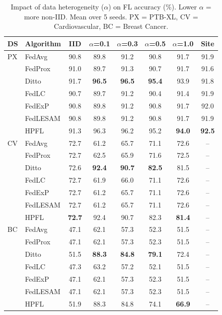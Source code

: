 \documentclass[conference,a4paper]{IEEEtran}
\begin{document}
\begin{table}[t]
\centering
\caption{Impact of data heterogeneity ($\alpha$) on FL accuracy (\%). Lower $\alpha$ = more non-IID. Mean over 5 seeds. PX = PTB-XL, CV = Cardiovascular, BC = Breast Cancer.}
\label{tab:heterogeneity}
\small
\begin{tabular}{llcccccc}
\toprule
\textbf{DS} & \textbf{Algorithm} & \textbf{IID} & \textbf{$\alpha$=0.1} & \textbf{$\alpha$=0.3} & \textbf{$\alpha$=0.5} & \textbf{$\alpha$=1.0} & \textbf{Site} \\
\midrule
PX & FedAvg & 90.8 & 89.8 & 91.2 & 90.8 & 91.7 & 91.9 \\
 & FedProx & 91.0 & 89.7 & 91.3 & 90.7 & 91.7 & 91.6 \\
 & Ditto & 91.7 & \textbf{96.5} & \textbf{96.5} & \textbf{95.4} & 93.9 & 91.8 \\
 & FedLC & 90.7 & 89.7 & 91.2 & 90.4 & 91.4 & 91.9 \\
 & FedExP & 90.8 & 89.8 & 91.2 & 90.8 & 91.7 & 92.0 \\
 & FedLESAM & 90.8 & 89.8 & 91.2 & 90.8 & 91.7 & 91.9 \\
 & HPFL & 91.3 & 96.3 & 96.2 & 95.2 & \textbf{94.0} & \textbf{92.5} \\
\midrule
CV & FedAvg & 72.7 & 61.2 & 65.7 & 71.1 & 72.6 & -- \\
 & FedProx & 72.7 & 62.5 & 65.9 & 71.6 & 72.5 & -- \\
 & Ditto & 72.6 & \textbf{92.4} & \textbf{90.7} & \textbf{82.5} & 81.5 & -- \\
 & FedLC & 72.7 & 61.9 & 66.0 & 71.1 & 72.6 & -- \\
 & FedExP & 72.7 & 61.2 & 65.7 & 71.1 & 72.6 & -- \\
 & FedLESAM & 72.7 & 61.2 & 65.7 & 71.1 & 72.6 & -- \\
 & HPFL & \textbf{72.7} & 92.4 & 90.7 & 82.3 & \textbf{81.4} & -- \\
\midrule
BC & FedAvg & 47.1 & 62.1 & 57.3 & 52.3 & 51.5 & -- \\
 & FedProx & 47.1 & 62.1 & 57.3 & 52.3 & 51.5 & -- \\
 & Ditto & 51.5 & \textbf{88.3} & \textbf{84.8} & \textbf{79.1} & 72.4 & -- \\
 & FedLC & 47.3 & 63.2 & 57.2 & 52.1 & 51.5 & -- \\
 & FedExP & 47.1 & 62.1 & 57.3 & 52.3 & 51.5 & -- \\
 & FedLESAM & 47.1 & 62.1 & 57.3 & 52.3 & 51.5 & -- \\
 & HPFL & 51.9 & 88.3 & 84.8 & 74.1 & \textbf{66.9} & -- \\
\bottomrule
\end{tabular}
\end{table}
\end{document}
